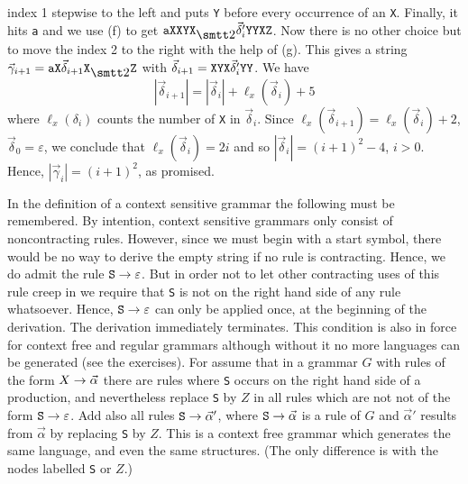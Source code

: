 index 1 stepwise to the left and puts {\tt Y} before every occurrence
of an {\tt X}. Finally, it hits {\tt a} and we use (f) to get 
$\mbox{\tt aXXYX}_{\szwei} \vec{\delta}'_i\mbox{\tt YYXZ}$. Now there 
is no other choice but to move the index 2 to the right with the help 
of (g). This gives a string $\vec{\gamma}_{i+1} = 
\mbox{\tt aX}\vec{\delta}_{i+1}\mbox{\tt X}_{\szwei}\mbox{\tt Z}$ with 
$\vec{\delta}_{i+1} = \mbox{\tt XYX}\vec{\delta}'_i\mbox{\tt YY}$. 
We have
\begin{equation}
|\vec{\delta}_{i+1}| = |\vec{\delta}_i| + \ell_x(\vec{\delta}_i)
+ 5
\end{equation}
where $\ell_x(\delta_i)$ counts the number of {\tt X} in
$\vec{\delta}_i$. Since $\ell_x(\vec{\delta}_{i+1}) = \ell_x(\vec{\delta}_i)
+ 2$, $\vec{\delta}_0 = \varepsilon$, we conclude that 
$\ell_x(\vec{\delta}_i) = 2i$ and so $|\vec{\delta}_i| = (i+1)^2 - 4$, 
$i > 0$.  Hence, $|\vec{\gamma}_i| = (i+1)^2$, as promised. 

In the definition of a context sensitive grammar the following
must be remembered. By intention, context sensitive grammars only
consist of noncontracting rules. However, since we must begin with a
start symbol, there would be no way to derive the empty string if
no rule is contracting. Hence, we do admit the rule $\mbox{\tt S} %
\pf \varepsilon$. But in order not to let other contracting uses of 
this rule creep in we require that {\tt S} is not on the right hand 
side of any rule whatsoever. Hence, $\mbox{\tt S} \rightarrow \varepsilon$ 
can only be applied once, at the beginning of the derivation. The 
derivation immediately terminates. This condition is also in force 
for context free and regular grammars although without it no more 
languages can be generated (see the exercises). For assume that in a 
grammar $G$ with rules of the form $X \rightarrow \vec{\alpha}$ there
are rules where {\tt S} occurs on the right hand side of a production,
and nevertheless replace {\tt S} by $Z$ in all rules which are not not
of the form $\mbox{\tt S} \rightarrow \varepsilon$. Add also all rules 
$\mbox{\tt S} \rightarrow \vec{\alpha}'$, where $\mbox{\tt S} \rightarrow \vec{\alpha}$ 
is a rule of $G$ and $\vec{\alpha}'$ results from $\vec{\alpha}$ by 
replacing {\tt S} by $Z$. This is a context free grammar which generates 
the same language, and even the same structures. (The only difference 
is with the nodes labelled {\tt S} or $Z$.)

